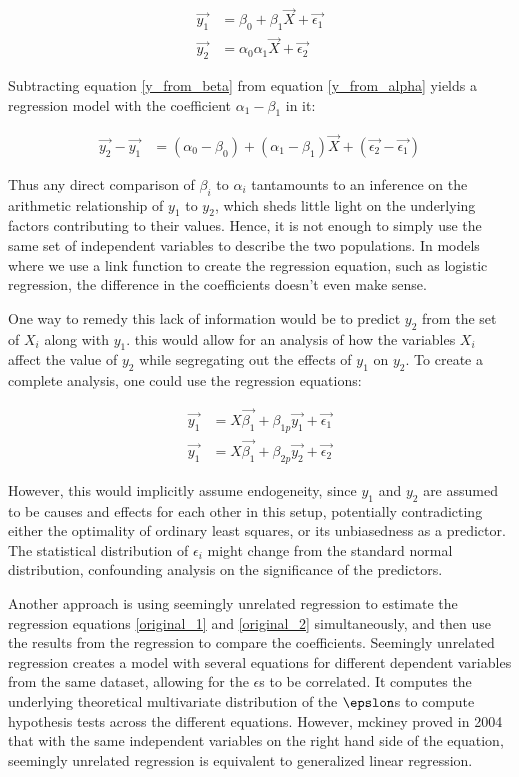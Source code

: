 \begin{align}  \vec{y_1} &= \beta_0 + \beta_1\vec{X} + \vec{\epsilon_1} \label{y_from_beta}\\
\vec{y_2} &=\alpha_0 \alpha_1 \vec{X} + \vec{\epsilon_2} \label{y_from_alpha}
\end{align}

Subtracting equation \ref{y_from_beta} from equation \ref{y_from_alpha} yields a regression model with the coefficient $\alpha_1 - \beta_1$ in it:

\begin{align}
\vec{y_2} - \vec{y_1} &=(\alpha_0 - \beta_0) + (\alpha_1 - \beta_1 ) \vec{X} + (\vec{\epsilon_2} - \vec{\epsilon_1})
\end{align}

Thus any direct comparison of $\beta_i$ to $\alpha_i$ tantamounts to an inference on the arithmetic relationship of $y_1$ to $y_2$, which sheds little light on the underlying factors contributing to their values. Hence, it is not enough to simply use the same set of independent variables to describe the two populations. In models where we use a link function to create the regression equation, such as logistic regression, the difference in the coefficients doesn't even make sense.

One way to remedy this lack of information would be to predict $y_2$ from the set of $X_i$ along with $y_1$. this would allow for an analysis of how the variables $X_i$ affect the value of $y_2$ while segregating out the effects of $y_1$ on $y_2$. To create a complete analysis, one could use the regression equations:

 \begin{align} \vec{y_1} &= X\vec{\beta_1} + \beta_{1p}\vec{y_1} + \vec{\epsilon_1} \\ \vec{y_1} &= X\vec{\beta_1} + \beta_{2p}\vec{y_2} +\vec{\epsilon_2}\end{align}

However, this would implicitly assume endogeneity, since $y_1$ and $y_2$ are assumed to be causes and effects for each other in this setup, potentially contradicting either the optimality of ordinary least squares, or its unbiasedness as a predictor. The statistical distribution of $\epsilon_i$ might change from the standard normal distribution, confounding analysis on the significance of the predictors.

Another approach is using seemingly unrelated regression to estimate the regression equations \ref{original_1} and \ref{original_2} simultaneously, and then use the results from the regression to compare the coefficients. Seemingly unrelated regression creates a model with several equations for different dependent variables from the same dataset, allowing for the $\epsilon$s to be correlated. It computes the underlying theoretical multivariate distribution of the $\epslon$s to compute hypothesis tests across the different equations. However, mckiney proved in 2004 that with the same independent variables on the right hand side of the equation, seemingly unrelated regression is equivalent to generalized linear regression.

